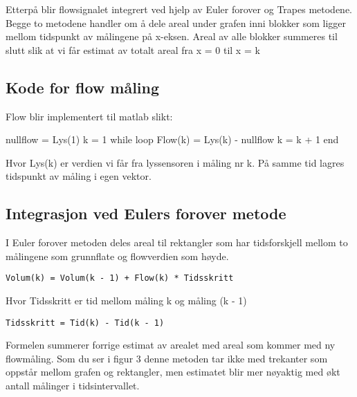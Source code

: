 \begin{figure}[H]
\centering
\scalebox{0.45}{}%
\end{figure}

Etterpå blir flowsignalet integrert ved hjelp av Euler forover og Trapes metodene. Begge to metodene handler om å dele areal under grafen inni blokker som ligger mellom tidspunkt av målingene på x-eksen. Areal av alle blokker summeres til slutt slik at vi får estimat av totalt areal fra x = 0 til x = k

\subsection{Kode for flow måling}

Flow blir implementert til matlab slikt:

\begin{python}
nullflow = Lys(1)
k = 1
while loop
   Flow(k) = Lys(k) - nullflow
   k = k + 1
end
\end{python}

Hvor Lys(k) er verdien vi får fra lyssensoren i måling nr k. På samme tid lagres tidspunkt av måling i egen vektor.

\subsection{Integrasjon ved Eulers forover metode}

\begin{figure}[H]
\centering
\end{figure}

I Euler forover metoden deles areal til rektangler som har tidsforskjell mellom to målingene som grunnflate og flowverdien som høyde.

\begin{lstlisting}
Volum(k) = Volum(k - 1) + Flow(k) * Tidsskritt
\end{lstlisting}

Hvor Tidsskritt er tid mellom måling k og måling (k - 1)

\begin{lstlisting}
Tidsskritt = Tid(k) - Tid(k - 1)
\end{lstlisting}

Formelen summerer forrige estimat av arealet med areal som kommer med ny flowmåling. Som du ser i figur 3 denne metoden tar ikke med trekanter som oppstår mellom grafen og rektangler, men estimatet blir mer nøyaktig med økt antall målinger i tidsintervallet.

